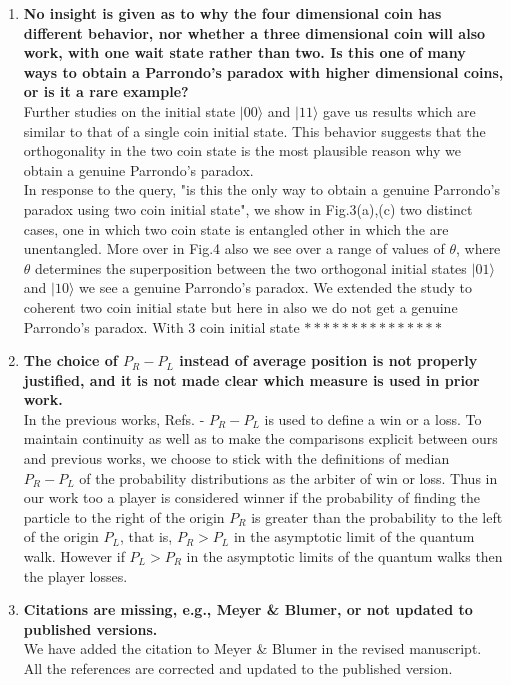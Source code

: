 \documentclass[10pt,a4paper]{article}
\begin{document}
\begin{enumerate}
\item \textbf{No insight is given as to why the four dimensional coin
has different behavior, nor whether a three dimensional coin will also
work, with one wait state rather than two. Is this one of many ways to
obtain a Parrondo's paradox with higher dimensional coins, or is it a
rare example?}\\
Further studies on the initial state $\vert 00\rangle$ and $\vert 11\rangle$ gave us results which are similar to that of a single coin initial state. This behavior suggests that the orthogonality in the two coin state is the most plausible reason why we obtain a genuine Parrondo's paradox.\\ 
In response to the query, "is this the only way to obtain a genuine Parrondo's paradox using two coin initial state", we show in Fig.3(a),(c) two distinct cases, one in which two coin state is entangled other in which the are unentangled. More over in Fig.4 also we see over a range of values of $\theta$, where $\theta$ determines the superposition between the two orthogonal initial states $\vert 01 \rangle$ and $\vert 10 \rangle$ we see a genuine Parrondo's paradox. We extended the study to coherent two coin initial state but here in also we do not get a genuine Parrondo's paradox. With 3 coin initial state $***************$ 
\item  \textbf{The choice of $P_R - P_L$ instead of average
position is not properly justified, and it is not made clear which
measure is used in prior work.} \\
In the previous works, Refs. \cite{chandru}-\cite{minli} $P_R-P_L$ is used to define a win or a loss. To maintain continuity as well as to make the comparisons explicit between ours and previous works, we choose to stick with the definitions of median $P_R-P_L$ of the probability distributions as the arbiter of win or loss. Thus in our work too a player is considered winner if the probability of finding the particle to the right of the origin $P_R$ is greater than the probability to the left of the origin $P_L$, that is, $P_R > P_L$ in the asymptotic limit of the quantum walk. However if $P_L > P_R$ in the asymptotic limits of the quantum walks then the player losses.
\item \textbf{Citations are missing, e.g., Meyer \& Blumer, or not updated to published versions.}\\
We have added the citation to  Meyer \& Blumer in the revised manuscript. All the references are corrected and updated to the published version.
\end{enumerate}
\end{document}
